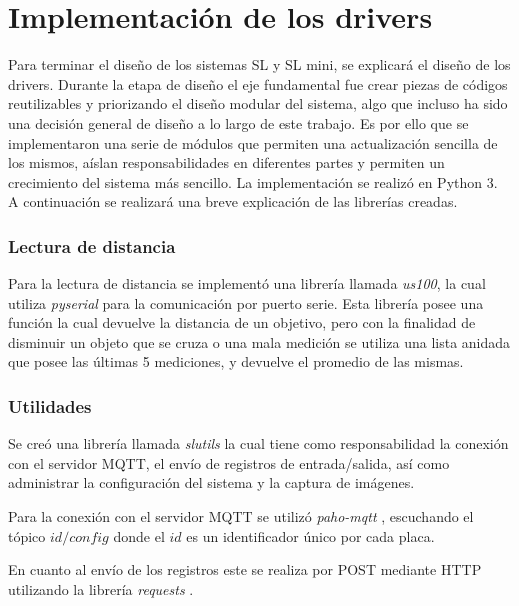 \section{Implementación de los drivers}

Para terminar el diseño de los sistemas SL y SL mini, se explicará el diseño de los drivers. Durante la etapa de diseño el eje fundamental fue crear piezas de códigos reutilizables y priorizando el diseño modular del sistema, algo que incluso ha sido una decisión general de diseño a lo largo de este trabajo. Es por ello que se implementaron una serie de módulos que permiten una actualización sencilla de los mismos, aíslan responsabilidades en diferentes partes y permiten un crecimiento del sistema más sencillo. La implementación se realizó en Python 3. A continuación se realizará una breve explicación de las librerías creadas.


\subsubsection*{Lectura de distancia}

Para la lectura de distancia se implementó una librería llamada \textit{us100}, la cual utiliza \textit{pyserial}  \cite{noauthor_documentacion_nodate-1} para la comunicación por puerto serie. Esta librería posee una función la cual devuelve la distancia de un objetivo, pero con la finalidad de disminuir un objeto que se cruza o una mala medición se utiliza una lista anidada que posee las últimas 5 mediciones, y devuelve el promedio de las mismas.

\subsubsection*{Utilidades}

Se creó una librería llamada \textit{slutils} la cual tiene como responsabilidad la conexión con el servidor MQTT, el envío de registros de entrada/salida, así como administrar la configuración del sistema y la captura de imágenes.

Para la conexión con el servidor MQTT se utilizó \textit{paho-mqtt} \cite{craggs_documentacion_nodate}, escuchando el tópico \textit{$id/config$} donde el $id$ es un identificador único por cada placa.

En cuanto al envío de los registros este se realiza por POST mediante HTTP utilizando la librería \textit{requests} \cite{python_software_foundation_documentacion_nodate}.

